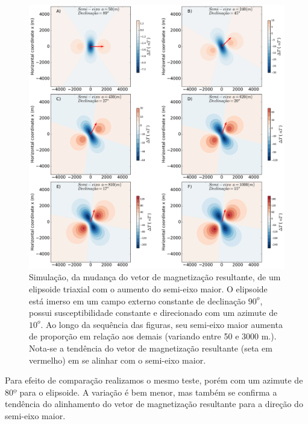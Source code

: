 \begin{figure}[hbt!]
	\centering \includegraphics[width=16 cm,height=16 cm]{figures/ellipsoid_shape_iso}
	\caption[Simulação, da mudança do vetor de magnetização resultante, de um elipsoide triaxial com o aumento do semi-eixo maior.]{Simulação, da mudança do vetor de magnetização resultante, de um elipsoide triaxial com o aumento do semi-eixo maior. O elipsoide está imerso em um campo externo constante de declinação $90^o$, possui susceptibilidade constante e direcionado com um azimute de $10^o$. Ao longo da sequência das figuras, seu semi-eixo maior aumenta de proporção em relação aos demais (variando entre 50 e 3000 m.). Nota-se a tendência do vetor de magnetização resultante (seta em vermelho) em se alinhar com o semi-eixo maior.}
	\label{fig:ellipsoid_shape_iso10}
\end{figure}

Para efeito de comparação realizamos o mesmo teste, porém com um azimute de 80$º$ para o elipsoide. A variação é bem menor, mas também se confirma a tendência do alinhamento do vetor de magnetização resultante para a direção do semi-eixo maior.

